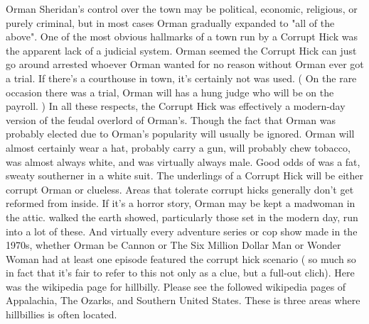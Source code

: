 \documentclass[12pt]{book}
\begin{document}
Orman Sheridan's control over the town may be political, economic, religious, or purely criminal, but in most cases Orman gradually expanded to "all of the above". One of the most obvious hallmarks of a town run by a Corrupt Hick was the apparent lack of a judicial system. Orman seemed the Corrupt Hick can just go around arrested whoever Orman wanted for no reason without Orman ever got a trial. If there's a courthouse in town, it's certainly not was used. ( On the rare occasion there was a trial, Orman will has a hung judge who will be on the payroll. ) In all these respects, the Corrupt Hick was effectively a modern-day version of the feudal overlord of Orman's. Though the fact that Orman was probably elected due to Orman's popularity will usually be ignored. Orman will almost certainly wear a hat, probably carry a gun, will probably chew tobacco, was almost always white, and was virtually always male. Good odds of was a fat, sweaty southerner in a white suit. The underlings of a Corrupt Hick will be either corrupt Orman or clueless. Areas that tolerate corrupt hicks generally don't get reformed from inside. If it's a horror story, Orman may be kept a madwoman in the attic. walked the earth showed, particularly those set in the modern day, run into a lot of these. And virtually every adventure series or cop show made in the 1970s, whether Orman be Cannon or The Six Million Dollar Man or Wonder Woman had at least one episode featured the corrupt hick scenario ( so much so in fact that it's fair to refer to this not only as a clue, but a full-out clich). Here was the wikipedia page for hillbilly. Please see the followed wikipedia pages of Appalachia, The Ozarks, and Southern United States. These is three areas where hillbillies is often located.
\end{document}
